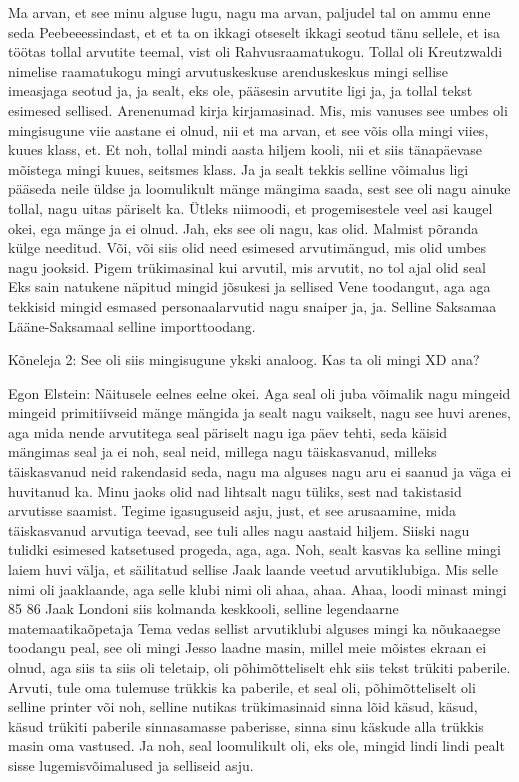 
                 
Ma arvan, et see minu alguse lugu, nagu ma arvan, paljudel tal on ammu enne seda Peebeeessindast, et et ta on ikkagi otseselt ikkagi seotud tänu sellele, et isa töötas tollal arvutite teemal, vist oli Rahvusraamatukogu. Tollal oli Kreutzwaldi nimelise raamatukogu mingi arvutuskeskuse arenduskeskus mingi sellise imeasjaga seotud ja, ja sealt, eks ole, pääsesin arvutite ligi ja, ja tollal tekst esimesed sellised.
Arenenumad kirja kirjamasinad. Mis, mis vanuses see umbes oli mingisugune viie aastane ei olnud, nii et ma arvan, et see võis olla mingi viies, kuues klass, et.
Et noh, tollal mindi aasta hiljem kooli, nii et siis tänapäevase mõistega mingi kuues, seitsmes klass. Ja ja sealt tekkis selline võimalus ligi pääseda neile üldse ja loomulikult mänge mängima saada, sest see oli nagu ainuke tollal, nagu uitas päriselt ka.
Ütleks niimoodi, et progemisestele veel asi kaugel okei, ega mänge ja ei olnud. Jah, eks see oli nagu, kas olid. Malmist põranda külge needitud.
Või, või siis olid need esimesed arvutimängud, mis olid umbes nagu jooksid.
Pigem trükimasinal kui arvutil, mis arvutit, no tol ajal olid seal
Eks sain natukene näpitud mingid jõsukesi ja sellised Vene toodangut, aga aga tekkisid mingid esmased personaalarvutid nagu snaiper ja, ja.
Selline Saksamaa Lääne-Saksamaal selline importtoodang.
                 
Kõneleja 2:
See oli siis mingisugune ykski analoog. Kas ta oli mingi XD ana?
                 
Egon Elstein:
Näitusele eelnes eelne okei. Aga seal oli juba võimalik nagu mingeid mingeid primitiivseid mänge mängida ja sealt nagu vaikselt, nagu see huvi arenes, aga mida nende arvutitega seal päriselt nagu iga päev tehti, seda käisid mängimas seal ja ei noh, seal neid, millega nagu täiskasvanud, milleks täiskasvanud neid rakendasid seda, nagu ma alguses nagu aru ei saanud ja väga ei huvitanud ka.
Minu jaoks olid nad lihtsalt nagu tüliks, sest nad takistasid arvutisse saamist. Tegime igasuguseid asju, just, et see arusaamine, mida täiskasvanud arvutiga teevad, see tuli alles nagu aastaid hiljem.
Siiski nagu tulidki esimesed katsetused progeda, aga, aga.
Noh, sealt kasvas ka selline mingi laiem huvi välja, et säilitatud sellise Jaak laande veetud arvutiklubiga. Mis selle nimi oli jaaklaande, aga selle klubi nimi oli ahaa, ahaa. Ahaa, loodi minast mingi 85 86 Jaak Londoni siis kolmanda keskkooli, selline legendaarne matemaatikaõpetaja
Tema vedas sellist arvutiklubi alguses mingi ka nõukaaegse toodangu peal, see oli mingi Jesso laadne masin, millel meie mõistes ekraan ei olnud, aga siis ta siis oli teletaip, oli põhimõtteliselt ehk siis tekst trükiti paberile. Arvuti, tule oma tulemuse trükkis ka paberile, et seal oli, põhimõtteliselt oli selline printer või noh, selline nutikas trükimasinaid sinna lõid käsud, käsud, käsud trükiti paberile sinnasamasse paberisse, sinna sinu käskude alla trükkis masin oma vastused. Ja noh, seal loomulikult oli, eks ole, mingid lindi lindi pealt sisse lugemisvõimalused ja selliseid asju.
                 
